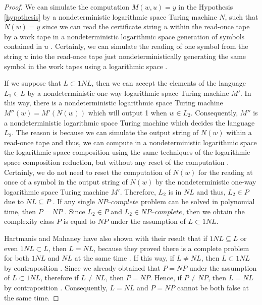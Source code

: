 \documentclass[a4paper,UKenglish,cleveref, autoref]{lipics-v2019}
\begin{document}
\begin{proof}
We can simulate the computation $M(w, u) = y$ in the Hypothesis \ref{hypothesis} by a nondeterministic logarithmic space Turing machine $N$, such that $N(w) = y$ since we can read the certificate string $u$ within the read-once tape by a work tape in a nondeterministic logarithmic space generation of symbols contained in $u$ \cite{Pap03}. Certainly, we can simulate the reading of one symbol from the string $u$ into the read-once tape just nondeterministically generating the same symbol in the work tapes using a logarithmic space \cite{Pap03}.

If we suppose that $L \subset 1NL$, then we can accept the elements of the language $L_{1} \in L$ by a nondeterministic one-way logarithmic space Turing machine $M'$. In this way, there is a nondeterministic logarithmic space Turing machine $M''(w) = M'(N(w))$ which will output 1 when $w \in L_{2}$. Consequently, $M''$ is a nondeterministic logarithmic space Turing machine which decides the language $L_{2}$. The reason is because we can simulate the output string of $N(w)$ within a read-once tape and thus, we can compute in a nondeterministic logarithmic space the logarithmic space composition using the same techniques of the logarithmic space composition reduction, but without any reset of the computation \cite{Pap03}. Certainly, we do not need to reset the computation of $N(w)$ for the reading at once of a symbol in the output string of $N(w)$ by the nondeterministic one-way logarithmic space Turing machine $M'$. Therefore, $L_{2}$ is in $NL$ and thus, $L_{2} \in P$ due to $NL \subseteq P$ \cite{Pap03}. If any single $\textit{NP--complete}$ problem can be solved in polynomial time, then $P = NP$ \cite{CLRS01}. Since $L_{2} \in P$ and $L_{2} \in \textit{NP--complete}$, then we obtain the complexity class $P$ is equal to $NP$ under the assumption of $L \subset 1NL$.

Hartmanis and Mahaney have also shown with their result that if $1NL \subseteq L$ or even $1NL \subset L$, then $L=NL$, because they proved there is a complete problem for both $1NL$ and $NL$ at the same time \cite{HM81}. If this way, if $L \neq NL$, then $L \subset 1NL$ by contraposition \cite{Pap03}. Since we already obtained that $P = NP$ under the assumption of $L \subset 1NL$, therefore if $L \neq NL$, then $P = NP$. Hence, if $P \neq NP$, then $L = NL$ by contraposition \cite{Pap03}. Consequently, $L = NL$ and $P = NP$ cannot be both false at the same time.
\end{proof}
\end{document}
